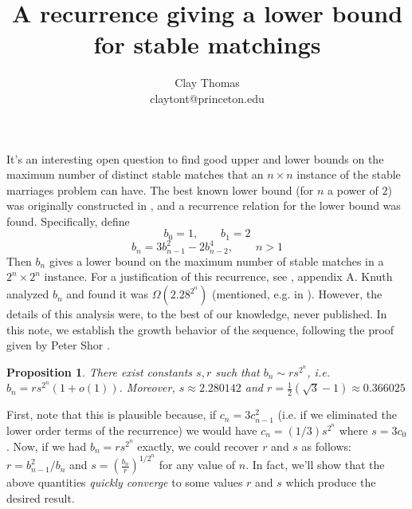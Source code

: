 \documentclass[12pt]{article}
\newtheorem{proposition}[definition]{Proposition}
\begin{document}
 
\title{
  A recurrence giving a lower bound for stable matchings
}
\author{Clay Thomas\\
claytont@princeton.edu}
\maketitle

It's an interesting open question to find good upper and lower bounds on the
maximum number of distinct stable matches that an $n\times n$ instance of the
stable marriages problem can have.
The best known lower bound (for $n$ a power of $2$) was originally constructed
in \cite{IrvingCountingStab86},
and a recurrence relation for the lower bound was found.
Specifically, define
  \[ b_0 = 1, \qquad b_1 = 2 \]
  \[ b_n = 3 b_{n-1}^2 - 2 b_{n-2}^4, \qquad n > 1 \]
Then $b_n$ gives a lower bound on the maximum number of stable matches in
a $2^n \times 2^n$ instance.
For a justification of this recurrence, see \cite{ThurberConcerningMaxStab02},
appendix A.
Knuth analyzed $b_n$ and found it was $\Omega(2.28^{2^n})$
(mentioned, e.g. in \cite{PittelAverageStable89}).
However, the details of this analysis were, to the best of our knowledge,
never published.
In this note, we establish the growth behavior of the sequence,
following the proof given by Peter Shor \cite{ShorAsymptoticStab19}.

\begin{proposition}
  There exist constants $s, r$ such that $b_n \sim r s^{2^n}$,
  i.e. $b_n = rs^{2^n}(1 + o(1))$.
  Moreover, $s\approx 2.280142$ and $r = \frac 1 2 (\sqrt 3 - 1) 
  \approx 0.366025$
\end{proposition}

First, note that this is plausible because, if $c_n = 3 c_{n-1}^2$ (i.e. if we
eliminated the lower order terms of the recurrence)
we would have $c_n = (1/3) s^{2^n}$ where $s=3c_0$.
Now, if we had $b_n = r s^{2^n}$ exactly, we could recover $r$ and $s$ as
follows: $r = b_{n-1}^2 / b_n$ and
$s = \left(\frac{b_n}{r}\right)^{1/2^n}$ for any value of $n$.
In fact, we'll show that the above quantities \emph{quickly converge} to some
values $r$ and $s$ which produce the desired result.
\end{document}
